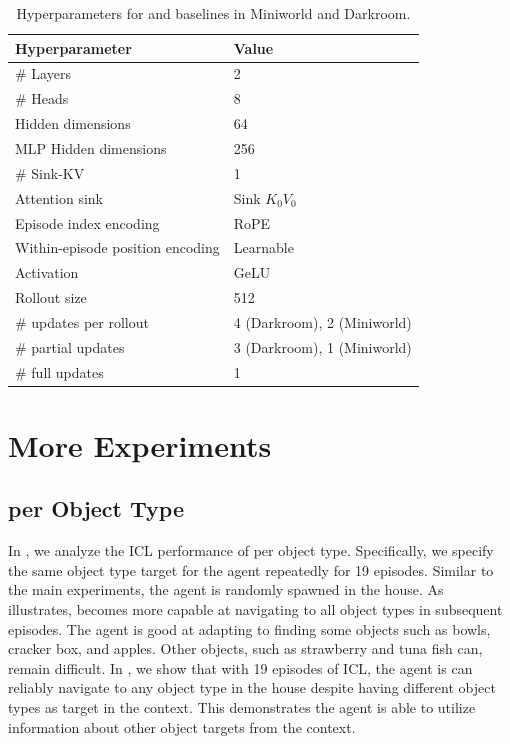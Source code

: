 \begin{table}[!htb]
  \centering
  \begin{tabular}{ll}
    \toprule
    Hyperparameter     & Value \\
    \midrule
    \# Layers & 2 \\
    \# Heads & 8 \\
    Hidden dimensions & 64 \\
    MLP Hidden dimensions & 256 \\
    \# Sink-KV & 1 \\
    Attention sink & Sink $K_0V_0$ \\
    Episode index encoding & RoPE \cite{su2023roformer} \\
    Within-episode position encoding & Learnable \\
    Activation & GeLU \cite{shazeer2020glu} \\
    Rollout size & 512 \\
    \# updates per rollout & 4 (Darkroom), 2 (Miniworld) \\
    \# partial updates & 3 (Darkroom), 1 (Miniworld) \\
    \# full updates & 1  \\
    \bottomrule
  \end{tabular}
  \caption{Hyperparameters for \method and baselines in Miniworld and Darkroom.}
  \label{tab:tiny-transformer-hparam}
  \label{tab:darkroom-miniworld-hparam}
\end{table}

\section{More Experiments}



\subsection{\method per Object Type}
\label{sec:per-obj} 
In , we analyze the ICL performance of \method per object type. Specifically, we specify the same object type target for the agent repeatedly for 19 episodes. Similar to the main experiments, the agent is randomly spawned in the house. As  illustrates, \method becomes more capable at navigating to all object types in subsequent episodes. The agent is good at adapting to finding some objects such as bowls, cracker box, and apples. Other objects, such as strawberry and tuna fish can, remain difficult. 
In , we show that with 19 episodes of ICL, the agent is can reliably navigate to any object type in the house despite having different object types as target in the context. This demonstrates the agent is able to utilize information about other object targets from the context.

